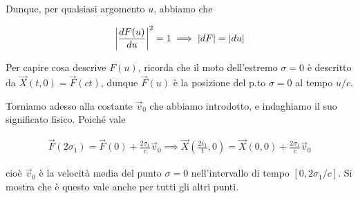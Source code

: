 \documentclass{report}
\begin{document}
Dunque, per qualsiasi argomento \(u\), abbiamo che 

\begin{align}
    \biggr|\frac{dF(u)}{du}\biggr|^2 = 1 \implies \lvert dF\rvert = \lvert du\rvert
\end{align}

Per capire cosa descrive \(F(u)\), ricorda che il moto dell'estremo \(\sigma =0\) è descritto da \(\vec{X}(t, 0) = \vec{F}(ct)\), dunque \(\vec{F}(u)\) è la posizione del p.to \(\sigma =0\) al tempo \(u/c\). 

Torniamo adesso alla costante \(\vec{v}_0\) che abbiamo introdotto, e indaghiamo il suo significato fisico. Poiché vale 

\begin{align}
    \vec{F}(2\sigma_1) = \vec{F}(0) + \frac{2\sigma_1}{c}\vec{v}_0 \implies \vec{X}\left(\frac{2c_1}{t}, 0\right) = \vec{X}(0, 0) + \frac{2\sigma_1}{c}\vec{v}_0
\end{align}

cioè \(\vec{v}_0\) è la velocità media del punto \(\sigma =0\) nell'intervallo di tempo \([0, 2\sigma_1/c]\). Si mostra che è questo vale anche per tutti gli altri punti. 
\end{document}
